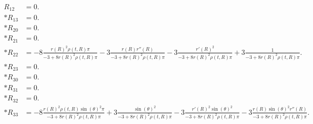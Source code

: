 \documentclass[fleqn,portrait]{article}
\begin{document}
\begin{align*}
R_{12} & = 0. \\*
R_{13} & = 0. \\*
R_{20} & = 0. \\*
R_{21} & = 0. \\*
R_{22} & = -8 \frac{ r(R)^{2} \rho(t,R) \pi}{-3+8  r(R)^{2} \rho(t,R) \pi}-3 \frac{ r(R) r''(R)}{-3+8  r(R)^{2} \rho(t,R) \pi}-3 \frac{r'(R)^{2}}{-3+8  r(R)^{2} \rho(t,R) \pi}+3 \frac{1}{-3+8  r(R)^{2} \rho(t,R) \pi}. \\*
R_{23} & = 0. \\*
R_{30} & = 0. \\*
R_{31} & = 0. \\*
R_{32} & = 0. \\*
R_{33} & = -8 \frac{ r(R)^{2} \rho(t,R) \sin(\theta)^{2} \pi}{-3+8  r(R)^{2} \rho(t,R) \pi}+3 \frac{\sin(\theta)^{2}}{-3+8  r(R)^{2} \rho(t,R) \pi}-3 \frac{ r'(R)^{2} \sin(\theta)^{2}}{-3+8  r(R)^{2} \rho(t,R) \pi}-3 \frac{ r(R) \sin(\theta)^{2} r''(R)}{-3+8  r(R)^{2} \rho(t,R) \pi}.
\end{align*}
\end{document}
